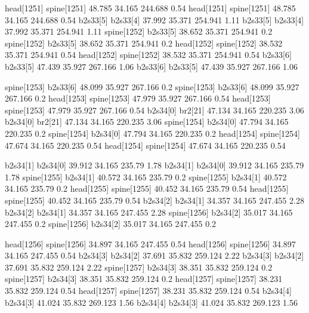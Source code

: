 head[1251]    spine[1251]    48.785    34.165    244.688    0.54
head[1251]    spine[1251]    48.785    34.165    244.688    0.54
b2s33[5]    b2s33[4]    37.992    35.371    254.941    1.11
b2s33[5]    b2s33[4]    37.992    35.371    254.941    1.11
spine[1252]    b2s33[5]    38.652    35.371    254.941    0.2
spine[1252]    b2s33[5]    38.652    35.371    254.941    0.2
head[1252]    spine[1252]    38.532    35.371    254.941    0.54
head[1252]    spine[1252]    38.532    35.371    254.941    0.54
b2s33[6]    b2s33[5]    47.439    35.927    267.166    1.06
b2s33[6]    b2s33[5]    47.439    35.927    267.166    1.06


spine[1253]    b2s33[6]    48.099    35.927    267.166    0.2
spine[1253]    b2s33[6]    48.099    35.927    267.166    0.2
head[1253]    spine[1253]    47.979    35.927    267.166    0.54
head[1253]    spine[1253]    47.979    35.927    267.166    0.54
b2s34[0]    br2[21]    47.134    34.165    220.235    3.06
b2s34[0]    br2[21]    47.134    34.165    220.235    3.06
spine[1254]    b2s34[0]    47.794    34.165    220.235    0.2
spine[1254]    b2s34[0]    47.794    34.165    220.235    0.2
head[1254]    spine[1254]    47.674    34.165    220.235    0.54
head[1254]    spine[1254]    47.674    34.165    220.235    0.54


b2s34[1]    b2s34[0]    39.912    34.165    235.79    1.78
b2s34[1]    b2s34[0]    39.912    34.165    235.79    1.78
spine[1255]    b2s34[1]    40.572    34.165    235.79    0.2
spine[1255]    b2s34[1]    40.572    34.165    235.79    0.2
head[1255]    spine[1255]    40.452    34.165    235.79    0.54
head[1255]    spine[1255]    40.452    34.165    235.79    0.54
b2s34[2]    b2s34[1]    34.357    34.165    247.455    2.28
b2s34[2]    b2s34[1]    34.357    34.165    247.455    2.28
spine[1256]    b2s34[2]    35.017    34.165    247.455    0.2
spine[1256]    b2s34[2]    35.017    34.165    247.455    0.2


head[1256]    spine[1256]    34.897    34.165    247.455    0.54
head[1256]    spine[1256]    34.897    34.165    247.455    0.54
b2s34[3]    b2s34[2]    37.691    35.832    259.124    2.22
b2s34[3]    b2s34[2]    37.691    35.832    259.124    2.22
spine[1257]    b2s34[3]    38.351    35.832    259.124    0.2
spine[1257]    b2s34[3]    38.351    35.832    259.124    0.2
head[1257]    spine[1257]    38.231    35.832    259.124    0.54
head[1257]    spine[1257]    38.231    35.832    259.124    0.54
b2s34[4]    b2s34[3]    41.024    35.832    269.123    1.56
b2s34[4]    b2s34[3]    41.024    35.832    269.123    1.56


